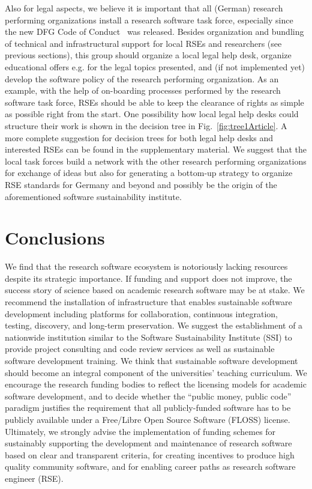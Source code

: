 \documentclass[a4paper,num-refs,numbers,sort&compress]{de-rse}
\begin{document}
Also for legal aspects, we believe it is important that all (German) research performing organizations install a research software task force, especially since the new DFG Code of Conduct~\cite{DFGcode} was released. Besides organization and bundling of technical and infrastructural support for local RSEs and researchers (see previous sections), this group should organize a local legal help desk, organize educational offers e.g. for the legal topics presented, and (if not implemented yet) develop the software policy of the research performing organization. As an example, with the help of on-boarding processes performed by the research software task force, RSEs should be able to keep the clearance of rights as simple as possible right from the start. One possibility how local legal help desks could structure their work is shown in the decision tree in Fig.~\ref{fig:tree1Article}. A more complete suggestion for decision trees for both legal help desks and interested RSEs can be found in the supplementary material. We suggest that the local task forces build a network with the other research performing organizations for exchange of ideas but also for generating a bottom-up strategy to organize RSE standards for Germany and beyond and possibly be the origin of the aforementioned software sustainability institute.


\section{Conclusions}
We find that the research software ecosystem is notoriously lacking resources despite its strategic importance. If funding and support does not improve, the success story of science based on academic research software may be at stake. 
We recommend the installation of infrastructure that enables sustainable software development including platforms for collaboration, continuous integration, testing, discovery, and long-term preservation.
We suggest the establishment of a nationwide institution similar to the Software Sustainability Institute (SSI) to provide project consulting and code review services as well as sustainable software development training. We think that sustainable software development should become an integral component of the universities' teaching curriculum.
We encourage the research funding bodies to reflect the licensing models for academic software development, and to decide whether the ``public money, public code'' paradigm justifies the requirement that all publicly-funded software has to be publicly available under a Free/Libre Open Source Software (FLOSS) license.
Ultimately, we strongly advise the implementation of funding schemes for sustainably supporting the development and maintenance of research software based on clear and transparent criteria, for creating incentives to produce high quality community software, and for enabling career paths as research software engineer (RSE).
\end{document}
